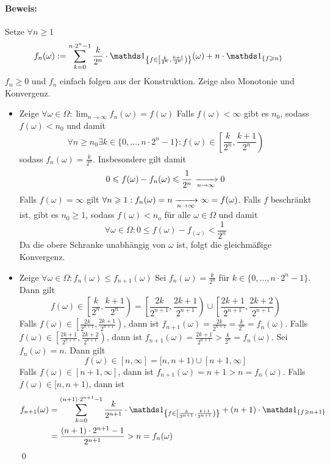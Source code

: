 \documentclass[12pt]{report}
\begin{document}
 \paragraph{Beweis:}Setze $\forall n\geq1$
 $$f_n(\omega):=\sum_{k=0}^{n\cdot2^n-1}\dfrac{k}{2^n}\cdot\ind{\left\{f\in\left[\frac{k}{2^n},\frac{k+1}{2^n}\right)\right\}}(\omega)+n\cdot\ind{\{f\geq n\}}$$
 $f_n\geq 0$ und $f_n$ einfach folgen aus der Konstruktion. Zeige also Monotonie und Konvergenz.
 \begin{itemize}
     \item Zeige $\forall\omega\in\Omega:\lim_{n\to\infty}f_n(\omega)=f(\omega)$\newline
        Falls $f(\omega)<\infty$ gibt es $n_0$, sodass $f(\omega)<n_0$ und damit 
        $$\forall n\geq n_0\exists k\in\{0,\hdots, n\cdot2^n-1\}:f(\omega)\in\left[\frac{k}{2^n},\frac{k+1}{2^n}\right)$$
        sodass $f_n(\omega)=\frac{k}{2^n}$. Insbesondere gilt damit
        $$0\leq f(\omega)-f_n(\omega)\leq\frac{1}{2^n}\nto{}{n\to\infty}0$$
        Falls $f(\omega)=\infty$ gilt $\forall n\geq1:f_n(\omega)=n\nto{}{n\to\infty}\infty=f(\omega)$.
        Falls $f$ beschr\"ankt ist, gibt es $n_0\geq1$, sodass $f(\omega)<n_o$ f\"ur alle $\omega\in\Omega$ und damit 
        $$\forall\omega\in\Omega:0\leq f(\omega)-f_(\omega)<\frac{1}{2^n}$$
        Da die obere Schranke unabh\"angig von $\omega$ ist, folgt die gleichm\"a\ss{}ige Konvergenz. 
        \item Zeige $\forall\omega\in\Omega:f_n(\omega)\leq f_{n+1}(\omega)$\newline
        Sei $f_n(\omega)=\frac{k}{2^n}$ f\"ur $k\in\{0,\hdots,n\cdot2^n-1\}$. Dann gilt
        $$f(\omega)\in\left[\frac{k}{2^n},\frac{k+1}{2^n}\right)=\left[\frac{2k}{2^{n+1}},\frac{2k+1}{2^{n+1}}\right)\cup\left[\frac{2k+1}{2^{n+1}},\frac{2k+2}{2^{n+1}}\right)$$
        Falls $f(\omega)\in \left[\frac{2k}{2^{n+1}},\frac{2k+1}{2^{n+1}}\right)$, dann ist $f_{n+1}(\omega)=\frac{2k}{2^{n+1}}=\frac{k}{2^n}=f_n(\omega)$. \newline
        Falls $f(\omega)\in\left[\frac{2k+1}{2^{n+1}},\frac{2k+2}{2^{n+1}}\right)$, dann ist $f_{n+1}(\omega)=\frac{2k+1}{2^{n+1}}>\frac{k}{2^n}=f_n(\omega)$.\newline\newline
        Sei $f_n(\omega)=n$. Dann gilt 
        $$f(\omega)\in [n,\infty]=[n,n+1)\cup[n+1,\infty]$$
        Falls $f(\omega)\in[n+1,\infty]$, dann ist $f_{n+1}(\omega)=n+1>n=f_n(\omega)$.\newline
        Falls $f(\omega)\in[n,n+1)$, dann ist 
        \begin{align*}
            f_{n+1}(\omega)&=\sum_{k=0}^{(n+1)\cdot2^{n+1}-1}\dfrac{k}{2^{n+1}}\cdot\ind{\left\{f\in\left[\frac{k}{2^{n+1}},\frac{k+1}{2^{n+1}}\right)\right\}}+(n+1)\cdot\ind{\{f\geq n+1\}}\\&=\dfrac{(n+1)\cdot2^{n+1}-1}{2^{n+1}}>n=f_n(\omega)\
        \end{align*}
        \qed
 \end{itemize}
 
\end{document}
